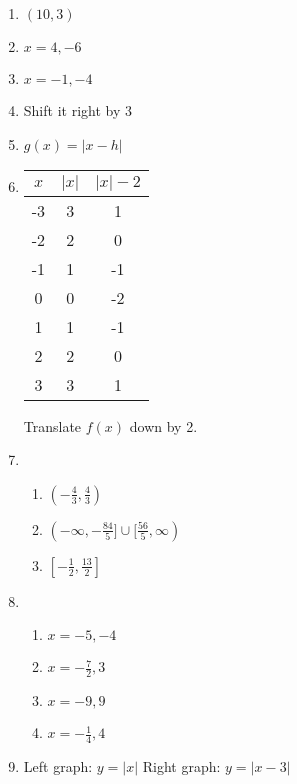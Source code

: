 \documentclass{article}
\begin{document}
\begin{enumerate}
\item $(10,3)$

\item $x = 4, -6$

\item $x = -1, -4$

\item Shift it right by 3

\item $g(x) = |x - h|$

\item
	\begin{tabular}{c | c | c}
	$x$ & $|x|$ & $|x| - 2$ \\
	\hline
	-3 & 3 & 1 \\
	-2 & 2 & 0 \\
	-1 & 1 & -1 \\
	0 & 0 & -2 \\
	1 & 1 & -1 \\
	2 & 2 & 0 \\
	3 & 3 & 1
	\end{tabular}
	
	Translate $f(x)$ down by 2.
	
\item

	\begin{enumerate}
	
	\item $(-\frac{4}{3}, \frac{4}{3})$
	
	\item $(-\infty, -\frac{84}{5}] \cup [\frac{56}{5}, \infty)$
	
	\item $[-\frac{1}{2}, \frac{13}{2}]$
	
	\end{enumerate}
	
\item

	\begin{enumerate}
	
	\item $x = -5, -4$
	
	\item $x = -\frac{7}{2}, 3$
	
	\item $x = -9, 9$
	
	\item $x = -\frac{1}{4}, 4$
	
	\end{enumerate}
	
\item Left graph: $y = |x|$ \newline
	Right graph: $y = |x - 3|$
	

\end{enumerate}
\end{document}
